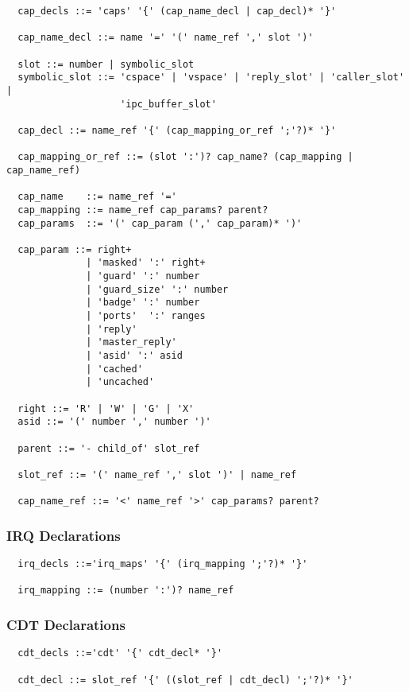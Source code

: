 \documentclass[a4paper,12pt]{article}
\begin{document}
\begin{verbatim}
  cap_decls ::= 'caps' '{' (cap_name_decl | cap_decl)* '}'

  cap_name_decl ::= name '=' '(' name_ref ',' slot ')'

  slot ::= number | symbolic_slot
  symbolic_slot ::= 'cspace' | 'vspace' | 'reply_slot' | 'caller_slot' |
                    'ipc_buffer_slot'

  cap_decl ::= name_ref '{' (cap_mapping_or_ref ';'?)* '}'

  cap_mapping_or_ref ::= (slot ':')? cap_name? (cap_mapping | cap_name_ref)

  cap_name    ::= name_ref '='
  cap_mapping ::= name_ref cap_params? parent?
  cap_params  ::= '(' cap_param (',' cap_param)* ')' 

  cap_param ::= right+
              | 'masked' ':' right+
              | 'guard' ':' number
              | 'guard_size' ':' number
              | 'badge' ':' number
              | 'ports'  ':' ranges
              | 'reply'
              | 'master_reply'
              | 'asid' ':' asid
              | 'cached'
              | 'uncached'

  right ::= 'R' | 'W' | 'G' | 'X'
  asid ::= '(' number ',' number ')'

  parent ::= '- child_of' slot_ref

  slot_ref ::= '(' name_ref ',' slot ')' | name_ref

  cap_name_ref ::= '<' name_ref '>' cap_params? parent?
\end{verbatim}


\subsubsection{IRQ Declarations}

\begin{verbatim}
  irq_decls ::='irq_maps' '{' (irq_mapping ';'?)* '}'

  irq_mapping ::= (number ':')? name_ref
\end{verbatim}


\subsubsection{CDT Declarations}

\begin{verbatim}
  cdt_decls ::='cdt' '{' cdt_decl* '}'

  cdt_decl ::= slot_ref '{' ((slot_ref | cdt_decl) ';'?)* '}'
\end{verbatim}
\end{document}
